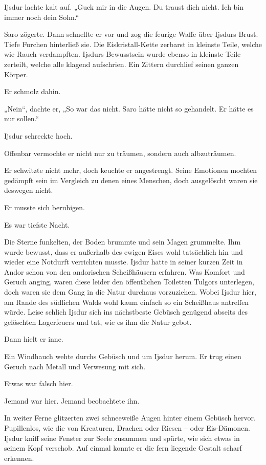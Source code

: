 Ijsdur lachte kalt auf. „Guck mir in die Augen. Du traust dich nicht. Ich bin immer noch dein Sohn.“

Saro zögerte. Dann schnellte er vor und zog die feurige Waffe über Ijsdurs Brust. Tiefe Furchen hinterließ sie. Die Eiskristall-Kette zerbarst in kleinste Teile, welche wie Rauch verdampften. Ijsdurs Bewusstsein wurde ebenso in kleinste Teile zerteilt, welche alle klagend aufschrien. Ein Zittern durchlief seinen ganzen Körper.

Er schmolz dahin.



„Nein“, dachte er, „So war das nicht. Saro hätte nicht so gehandelt. Er hätte es nur sollen.“\bigskip







Ijsdur schreckte hoch.

Offenbar vermochte er nicht nur zu träumen, sondern auch albzuträumen.

Er schwitzte nicht mehr, doch keuchte er angestrengt. Seine Emotionen mochten gedämpft sein im Vergleich zu denen eines Menschen, doch ausgelöscht waren sie deswegen nicht.

Er musste sich beruhigen.

Es war tiefste Nacht.

Die Sterne funkelten, der Boden brummte und sein Magen grummelte. Ihm wurde bewusst, dass er außerhalb des ewigen Eises wohl tatsächlich hin und wieder eine Notdurft verrichten musste. Ijsdur hatte in seiner kurzen Zeit in Andor schon von den andorischen Scheißhäusern erfahren. Was Komfort und Geruch anging, waren diese leider den öffentlichen Toiletten Tulgors unterlegen, doch waren sie dem Gang in die Natur durchaus vorzuziehen. Wobei Ijsdur hier, am Rande des südlichen Walds wohl kaum einfach so ein Scheißhaus antreffen würde. Leise schlich Ijsdur sich ins nächstbeste Gebüsch genügend abseits des gelöschten Lagerfeuers und tat, wie es ihm die Natur gebot.

Dann hielt er inne.

Ein Windhauch wehte durchs Gebüsch und um Ijsdur herum. Er trug einen Geruch nach Metall und Verwesung mit sich.

Etwas war falsch hier.

Jemand war hier. Jemand beobachtete ihn.

In weiter Ferne glitzerten zwei schneeweiße Augen hinter einem Gebüsch hervor. Pupillenlos, wie die von Kreaturen, Drachen oder Riesen – oder Eis-Dämonen. Ijsdur kniff seine Fenster zur Seele zusammen und spürte, wie sich etwas in seinem Kopf verschob. Auf einmal konnte er die fern liegende Gestalt scharf erkennen.


